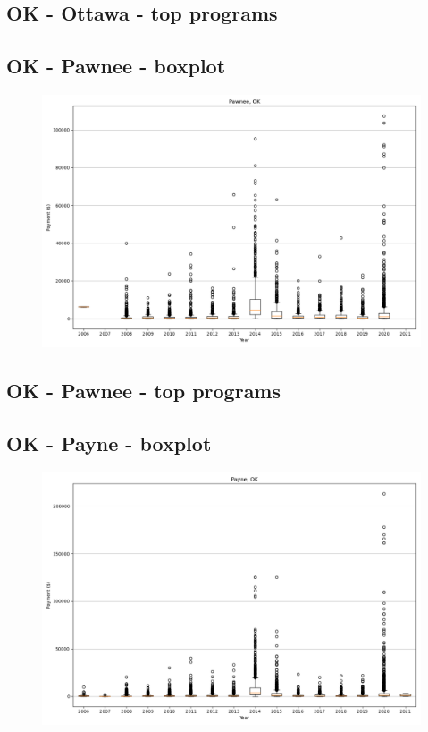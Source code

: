 \subsection*{OK - Ottawa - top programs}

\newpage
\subsection*{OK - Pawnee - boxplot}
\begin{figure}[h]
\centering
\includegraphics[width=7in]{../output/boxplots/counties/Pawnee-OK_boxplot.png}
\end{figure}


\subsection*{OK - Pawnee - top programs}

\newpage
\subsection*{OK - Payne - boxplot}
\begin{figure}[h]
\centering
\includegraphics[width=7in]{../output/boxplots/counties/Payne-OK_boxplot.png}
\end{figure}


